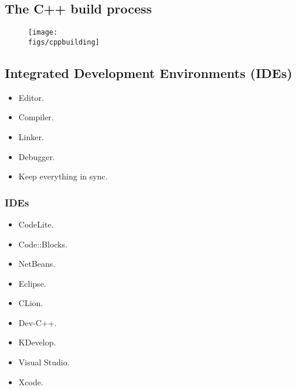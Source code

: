 \subsection{The C++ build process}
\begin{figure}[H]
    \centering
    \texttt{[image: \\figs/cppbuilding]}
\end{figure}

\subsection{Integrated Development Environments (IDEs)}
\begin{multicols}{2}
    \begin{itemize}
        \item Editor.
        \item Compiler.
        \item Linker.
        \item Debugger. 
        \item Keep everything in sync. 
    \end{itemize}
\end{multicols}
\subsubsection{IDEs}
\begin{multicols}{3}
    \begin{itemize}
        \item CodeLite. 
        \item Code::Blocks.
        \item NetBeans.
        \item Eclipse.
        \item CLion.
        \item Dev-C++.
        \item KDevelop.
        \item Visual Studio.
        \item Xcode.
    \end{itemize}    
\end{multicols}


